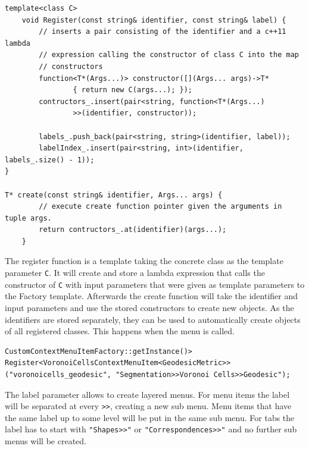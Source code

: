 \begin{lstlisting}[style=lstStyleCpp, caption=Factory.h]
template<class C>
    void Register(const string& identifier, const string& label) {
        // inserts a pair consisting of the identifier and a c++11 lambda 
        // expression calling the constructor of class C into the map 	
        // constructors
        function<T*(Args...)> constructor([](Args... args)->T* 
        		{ return new C(args...); });
        contructors_.insert(pair<string, function<T*(Args...)
        		>>(identifier, constructor));
        
        labels_.push_back(pair<string, string>(identifier, label));
        labelIndex_.insert(pair<string, int>(identifier, labels_.size() - 1));
}

T* create(const string& identifier, Args... args) {
        // execute create function pointer given the arguments in tuple args.
        return contructors_.at(identifier)(args...);
    }
\end{lstlisting}

The register function is a template taking the concrete class  as the template parameter \texttt{C}. It will create and store a lambda expression that calls the constructor of \texttt{C} with input parameters that were given as template parameters to the Factory template. Afterwards the create function will take the identifier and input parameters and use the stored constructors to create new objects. As the identifiers are stored separately, they can be used to automatically create objects of all registered classes. This happens when the menu is called.

\begin{lstlisting}[style=lstStyleCpp, numbers=none]
CustomContextMenuItemFactory::getInstance()>
Register<VoronoiCellsContextMenuItem<GeodesicMetric>>
("voronoicells_geodesic", "Segmentation>>Voronoi Cells>>Geodesic");
\end{lstlisting}

The label parameter allows to create layered menus. For menu items the label will be separated at every \texttt{>>}, creating a new sub menu. Menu items that have the same label up to some level will be put in the same sub menu. For tabs the label has to start with \texttt{"Shapes>>"} or \texttt{"Correspondences>>"} and no further sub menus will be created. 


